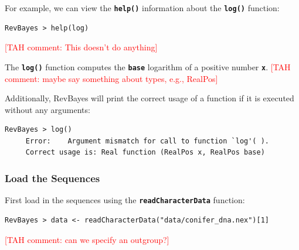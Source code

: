 \documentclass[11pt]{article}
\newcommand{\taha}[1]{{\textcolor{red}{[TAH comment: #1]}}} %
\newcommand{\cl}[1]{{\texttt{\textbf{#1}}}}
\newcommand{\mbcl}[1]{\exs{\cl{MrBayes > {#1}}}}
\begin{document}
For example, we can view the \cl{help()} information about the \cl{log()} function:

{\tt \begin{snugshade*}
\begin{lstlisting}
RevBayes > help(log)
\end{lstlisting}
\end{snugshade*}}

\taha{This doesn't do anything}

The \cl{log()} function computes the \cl{base} logarithm of a positive number \cl{x}. \taha{maybe say something about types, e.g., RealPos}

Additionally, RevBayes will print the correct usage of a function if it is executed without any arguments:
{\tt \begin{snugshade*}
\begin{lstlisting}
RevBayes > log()
     Error:    Argument mismatch for call to function `log'( ). 
     Correct usage is: Real function (RealPos x, RealPos base)
\end{lstlisting}
\end{snugshade*}}

%

\bigskip
\subsubsection*{Load the Sequences}%


First load in the sequences using the \cl{readCharacterData} function:

{\tt \begin{snugshade*}
\begin{lstlisting}
RevBayes > data <- readCharacterData("data/conifer_dna.nex")[1]
\end{lstlisting}
\end{snugshade*}}


\taha{can we specify an outgroup?}

\end{document}
